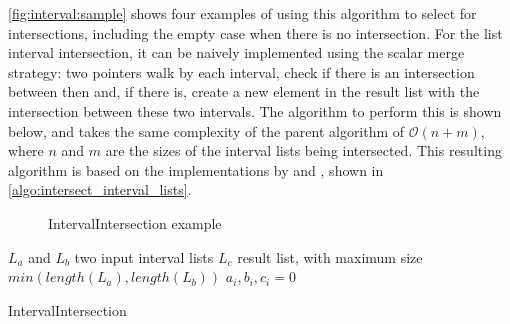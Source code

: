\autoref{fig:interval:sample} shows four examples of using this algorithm to select for intersections, including the empty case when there is no intersection.
For the list interval intersection, it can be naively implemented using the scalar merge strategy: two pointers walk by each interval, check if there is an intersection between then and, if there is, create a new element in the result list with the intersection between these two intervals.
The algorithm to perform this is shown below, and takes the same complexity of the parent algorithm of $\mathcal{O}(n + m)$, where $n$ and $m$ are the sizes of the interval lists being intersected.
This resulting algorithm is based on the implementations by \cite{liHighdimensionalOLAPMinimal2004} and \cite{silva:2015:abordagensParaCubo}, shown in \autoref{algo:intersect_interval_lists}.

\begin{figure}[!htb]
  \caption{IntervalIntersection example}\label{fig:interval:sample}
  \vspace{6mm}
  \begin{center}
  \end{center}
  \vspace{2mm}
\end{figure}

\begin{algorithm}[!htb]
\SetAlgoLined
{}
 $L_a$ and $L_b$ two input interval lists\;
 $L_c$ result list, with maximum size $min(length(L_a), length(L_b))$\;
 $a_i, b_i, c_i = 0$\;
 \;
 \caption{IntervalIntersection}\label{algo:intersect_interval_lists}
\end{algorithm}

